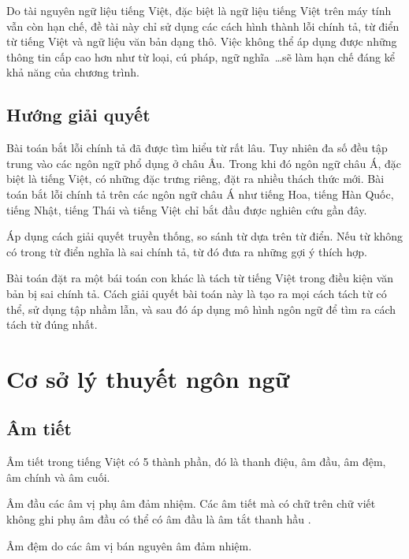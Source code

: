 \documentclass[a4paper,oneside]{book} %
\theoremstyle{break}
\begin{document}
Do tài nguyên ngữ liệu tiếng Việt, đặc biệt là ngữ liệu tiếng Việt
trên máy tính vẫn còn hạn chế, đề tài này chỉ sử dụng các cách hình
thành lỗi chính tả, từ điển từ tiếng Việt và ngữ liệu văn bản dạng
thô. Việc không thể áp dụng được những thông tin cấp cao hơn như từ
loại, cú pháp, ngữ nghĩa~\ldots sẽ làm hạn chế đáng kể khả năng của
chương trình.


\section{Hướng giải quyết}


Bài toán bắt lỗi chính tả đã được tìm hiểu từ rất lâu. Tuy nhiên đa số
đều tập trung vào các ngôn ngữ phổ dụng ở châu Âu. Trong khi đó ngôn
ngữ châu Á, đặc biệt là tiếng Việt, có những đặc trưng riêng, đặt ra
nhiều thách thức mới. Bài toán bắt lỗi chính tả trên các ngôn ngữ châu
Á như tiếng Hoa, tiếng Hàn Quốc, tiếng Nhật, tiếng Thái và tiếng Việt
chỉ bắt đầu được nghiên cứu gần đây.

Áp dụng cách giải quyết truyền thống, so sánh từ dựa trên từ điển. Nếu
từ không có trong từ điển nghĩa là sai chính tả, từ đó đưa ra những
gợi ý thích hợp.

Bài toán đặt ra một bái toán con khác là tách từ tiếng Việt trong điều
kiện văn bản bị sai chính tả. Cách giải quyết bài toán này là tạo ra
mọi cách tách từ có thể, sử dụng tập nhầm lẫn, và sau đó áp dụng mô hình
ngôn ngữ để tìm ra cách tách từ đúng nhất.

\chapter{Cơ sở lý thuyết ngôn ngữ}
\label{cha:vietnamese}
\minitoc



\section{Âm tiết}

Âm tiết trong tiếng Việt có 5 thành phần, đó là thanh điệu, âm đầu, âm
đệm, âm chính và âm cuối.

Âm đầu các âm vị phụ âm đảm nhiệm. Các âm tiết mà có chữ trên chữ viết
không ghi phụ âm đầu có thể có âm đầu là âm tắt thanh hầu .

Âm đệm do các âm vị bán nguyên âm  đảm nhiệm.
\end{document}
